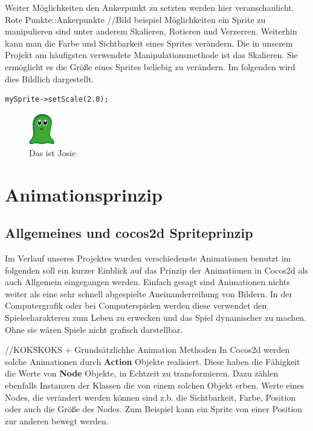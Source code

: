 Weiter Möglichkeiten den Ankerpunkt zu setzten werden hier veranschaulicht. Rote Punkte::Ankerpunkte
//Bild beispiel
Möglichkeiten ein Sprite zu manipulieren sind unter anderem Skalieren, Rotieren und Verzerren. Weiterhin kann man die Farbe und Sichtbarkeit eines Sprites verändern. Die in unserem Projekt am häufigsten verwendete Manipulationsmethode ist das Skalieren. Sie ermöglicht es die Größe eines Sprites beliebig zu verändern. Im folgenden wird dies Bildlich dargestellt. 

\begin{lstlisting}[style=singleline]
mySprite->setScale(2.0);
\end{lstlisting}



\begin{figure}[h]
  \includegraphics[width=0.1\textwidth]{resources/josie}
  \caption{Das ist Josie}
  \label{fig:josie} 
\end{figure}



\section{Animationsprinzip}\label{sec:2_Animationsprinzip}
\subsection{Allgemeines und cocos2d Spriteprinzip}
Im Verlauf unseres Projektes wurden verschiedenste Animationen benutzt im folgenden soll ein kurzer Einblick auf das Prinzip der Animationen in Cocos2d als auch Allgemein  eingegangen werden. Einfach gesagt sind Animationen nichts weiter als eine sehr schnell abgespielte Aneinanderreihung von Bildern. In der Computergrafik oder bei Computerspielen werden diese verwendet den Spielecharakteren zum Leben zu erwecken und das Spiel dynamischer zu machen. Ohne sie wären Spiele nicht grafisch darstellbar.

//KOKSKOKS + Grundsätzlichhe Animation Methoden
In Cocos2d werden solche Animationen durch \textbf{Action} Objekte realisiert. Diese haben die Fähigkeit die Werte von \textbf{Node} Objekte, in Echtzeit zu transformieren. Dazu zählen ebenfalls Instanzen der Klassen die von einem solchen Objekt erben. Werte eines Nodes, die verändert werden können sind z.b. die Sichtbarkeit, Farbe, Position oder auch die Größe des Nodes. Zum Beispiel kann ein Sprite von einer Position zur anderen bewegt werden.

